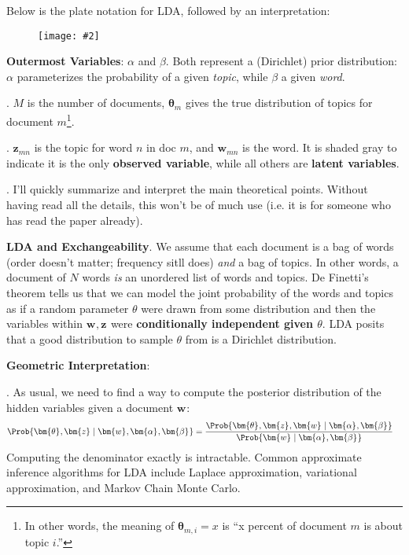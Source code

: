 \documentclass[11pt]{article}
\renewcommand\vec[2][]{\bm{#2}_{#1}}
\newcommand\myfig[2][0.3\textwidth]{\begin{figure}[h!]\centering\texttt{[image: \#2]}\end{figure}}
\newcommand\myspace[1][]{\vspace{#1\bigskipamount}}
\newcommand\p{\Needspace{10\baselineskip} \noindent}
\begin{document}
\p Below is the plate notation for LDA, followed by an interpretation:

\myfig[0.4\textwidth]{LDA_plate_notation.png}

\begin{compactitem}
	\item \textbf{Outermost Variables}: $\alpha$ and $\beta$. Both represent a (Dirichlet) prior distribution: $\alpha$ parameterizes the probability of a given \textit{topic}, while $\beta$ a given \textit{word}. 
	
	\item {}. $M$ is the number of documents, $\vec[m]{\theta}$ gives the true distribution of topics for document $m$\footnote{In other words, the meaning of $\vec[m,i]{\theta} = x$ is ``x percent of document $m$ is about topic $i$.''}.
	
	\item {}. $\vec[mn]{z}$ is the topic for word $n$ in doc $m$, and $\vec[mn]{w}$ is the word. It is shaded gray to indicate it is the only \textbf{observed variable}, while all others are \textbf{latent variables}. 
\end{compactitem}



\myspace
\p {}. I'll quickly summarize and interpret the main theoretical points. Without having read all the details, this won't be of much use (i.e. it is for someone who has read the paper already). 
\begin{compactitem}
	\item \textbf{LDA and Exchangeability}. We assume that each document is a bag of words (order doesn't matter; frequency sitll does) \textit{and} a bag of topics. In other words, a document of $N$ words \textit{is} an unordered list of words and topics. De Finetti's theorem tells us that we can model the joint probability of the words and topics as if a random parameter $\theta$ were drawn from some distribution and then the variables within $\vec{w},\vec{z}$ were \textbf{conditionally independent given $\theta$}. LDA posits that a good distribution to sample $\theta$ from is a Dirichlet distribution.
	
	\item \textbf{Geometric Interpretation}: 
\end{compactitem}

\myspace
\p {}. As usual, we need to find a way to compute the posterior distribution of the hidden variables given a document $\vec{w}$:
\begin{align}
	\Prob{\vec{\theta}, \vec{z} \mid \vec{w}, \vec{\alpha}, \vec{\beta}} 
		&= \frac{ 	\Prob{\vec{\theta}, \vec{z}, \vec{w} \mid \vec{\alpha}, \vec{\beta}}  }{ \Prob{ \vec{w} \mid \vec{\alpha}, \vec{\beta}}     }
\end{align}
Computing the denominator exactly is intractable. Common approximate inference algorithms for LDA include Laplace approximation, variational approximation, and Markov Chain Monte Carlo.
\end{document}
